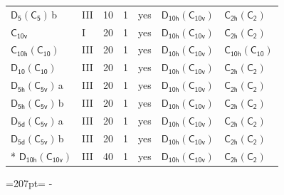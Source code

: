 \documentclass[10pt,a4paper]{article}
\newcommand{\needspace}[1]{\par\penalty-100\begingroup\dimen0=#1\relax\dimen2=\pagegoal
  \advance\dimen2-\pagetotal\ifdim\dimen0>\dimen2\relax\ifdim\dimen2>0pt\vfil\break\fi\fi
  \endgroup}
\numberwithin{equation}{section}
\newcommand{\grp}[1]{\mathsf{#1}}
\newcommand{\clsletter}[1]{\,{\scriptsize\color{black!55}#1}}
\begin{document}
{\begin{longtable}{@{}llrrlll@{}}
\href{D5-C5.pdf}{$\grp{D_{5}}(\grp{C_{5}})$}\clsletter{b} & III & 10 & 1 & yes & \href{D10h-C10v.pdf}{$\grp{D_{10h}}(\grp{C_{10v}})$} & \href{C2h-C2.pdf}{$\grp{C_{2h}}(\grp{C_{2}})$}\\
\href{../../../rotation/data/pdf/C10v.pdf}{$\grp{C_{10v}}$} & I & 20 & 1 & yes & \href{D10h-C10v.pdf}{$\grp{D_{10h}}(\grp{C_{10v}})$} & \href{C2h-C2.pdf}{$\grp{C_{2h}}(\grp{C_{2}})$}\\
\href{C10h-C10.pdf}{$\grp{C_{10h}}(\grp{C_{10}})$} & III & 20 & 1 & yes & \href{D10h-C10v.pdf}{$\grp{D_{10h}}(\grp{C_{10v}})$} & \href{C10h-C10.pdf}{$\grp{C_{10h}}(\grp{C_{10}})$}\\
\href{D10-C10.pdf}{$\grp{D_{10}}(\grp{C_{10}})$} & III & 20 & 1 & yes & \href{D10h-C10v.pdf}{$\grp{D_{10h}}(\grp{C_{10v}})$} & \href{C2h-C2.pdf}{$\grp{C_{2h}}(\grp{C_{2}})$}\\
\href{D5h-C5v.pdf}{$\grp{D_{5h}}(\grp{C_{5v}})$}\clsletter{a} & III & 20 & 1 & yes & \href{D10h-C10v.pdf}{$\grp{D_{10h}}(\grp{C_{10v}})$} & \href{C2h-C2.pdf}{$\grp{C_{2h}}(\grp{C_{2}})$}\\
\href{D5h-C5v.pdf}{$\grp{D_{5h}}(\grp{C_{5v}})$}\clsletter{b} & III & 20 & 1 & yes & \href{D10h-C10v.pdf}{$\grp{D_{10h}}(\grp{C_{10v}})$} & \href{C2h-C2.pdf}{$\grp{C_{2h}}(\grp{C_{2}})$}\\
\href{D5d-C5v.pdf}{$\grp{D_{5d}}(\grp{C_{5v}})$}\clsletter{a} & III & 20 & 1 & yes & \href{D10h-C10v.pdf}{$\grp{D_{10h}}(\grp{C_{10v}})$} & \href{C2h-C2.pdf}{$\grp{C_{2h}}(\grp{C_{2}})$}\\
\href{D5d-C5v.pdf}{$\grp{D_{5d}}(\grp{C_{5v}})$}\clsletter{b} & III & 20 & 1 & yes & \href{D10h-C10v.pdf}{$\grp{D_{10h}}(\grp{C_{10v}})$} & \href{C2h-C2.pdf}{$\grp{C_{2h}}(\grp{C_{2}})$}\\*
\href{D10h-C10v.pdf}{$\grp{D_{10h}}(\grp{C_{10v}})$} & III & 40 & 1 & yes & \href{D10h-C10v.pdf}{$\grp{D_{10h}}(\grp{C_{10v}})$} & \href{C2h-C2.pdf}{$\grp{C_{2h}}(\grp{C_{2}})$}\\
\bottomrule\end{longtable}}
\needspace{207pt}
\end{document}
